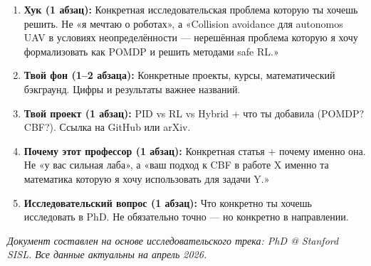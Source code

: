 \documentclass[10pt, a4paper]{article}
\begin{document}
\begin{enumerate}[leftmargin=1.5em, itemsep=4pt]
  \item \textbf{Хук (1 абзац):} Конкретная исследовательская проблема которую ты хочешь решить. Не «я мечтаю о роботах», а «Collision avoidance для autonomos UAV в условиях неопределённости — нерешённая проблема которую я хочу формализовать как POMDP и решить методами safe RL.»
  \item \textbf{Твой фон (1--2 абзаца):} Конкретные проекты, курсы, математический бэкграунд. Цифры и результаты важнее названий.
  \item \textbf{Твой проект (1 абзац):} PID vs RL vs Hybrid + что ты добавила (POMDP? CBF?). Ссылка на GitHub или arXiv.
  \item \textbf{Почему этот профессор (1 абзац):} Конкретная статья + почему именно она. Не «у вас сильная лаба», а «ваш подход к CBF в работе X именно та математика которую я хочу использовать для задачи Y.»
  \item \textbf{Исследовательский вопрос (1 абзац):} Что конкретно ты хочешь исследовать в PhD. Не обязательно точно — но конкретно в направлении.
\end{enumerate}

\vspace{6pt}
\begin{center}
{\small\color{darkgray}\itshape
Документ составлен на основе исследовательского трека: PhD @ Stanford SISL.
Все данные актуальны на апрель 2026.}
\end{center}
\end{document}

